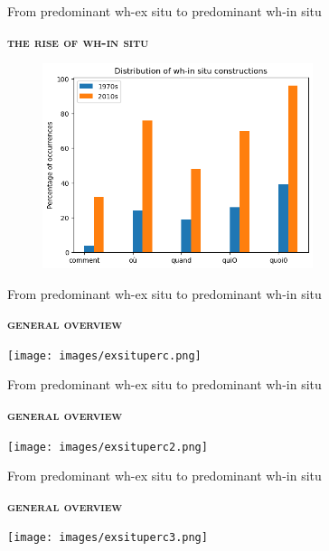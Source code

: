 \documentclass[lesson_slides]{subfiles}
\begin{document}
\begin{frame}[c]{From predominant wh-ex situ to predominant wh-in situ}

    \textbf{\textsc{the rise of wh-in situ}} \pause
    \begin{center}
        \includegraphics[width=10cm, height=6cm]{images/insitub.png}
    \end{center}
  
\end{frame}
\begin{frame}[c]{From predominant wh-ex situ to predominant wh-in situ}

    \textbf{\textsc{general overview}} \pause
    \begin{center}
        \texttt{[image: images/exsituperc.png]}
    \end{center}
  
\end{frame}
\begin{frame}[c]{From predominant wh-ex situ to predominant wh-in situ}

    \textbf{\textsc{general overview}}
    \begin{center}
        \texttt{[image: images/exsituperc2.png]}
    \end{center}
  
\end{frame}
\begin{frame}[c]{From predominant wh-ex situ to predominant wh-in situ}

    \textbf{\textsc{general overview}}
    \begin{center}
        \texttt{[image: images/exsituperc3.png]}
    \end{center}
  
\end{frame}
\end{document}
